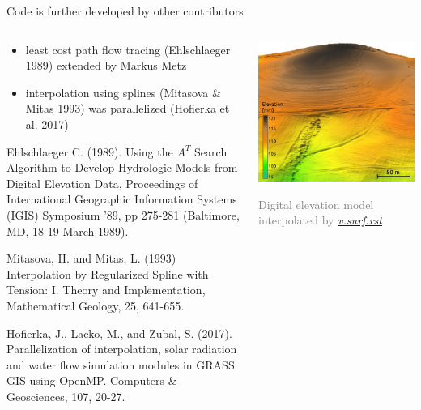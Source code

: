 \documentclass[xcolor={dvipsnames,usenames},beamer,aspectratio=169]{beamer}
\newcommand{\gmodule}[1]{\href{http://grass.osgeo.org/grass74/manuals/#1.html}{\emph{#1}}}
\begin{document}
\begin{frame}{Code is further developed by other contributors}

\begin{columns}
\begin{column}{0.5\textwidth}

\begin{itemize}
  \item least cost path flow tracing (Ehlschlaeger 1989) extended by Markus Metz
  \item interpolation using splines (Mitasova \& Mitas 1993) was parallelized (Hofierka et al. 2017)
\end{itemize}


\bigskip
\footnoterule
\tiny

Ehlschlaeger C. (1989). Using the $A^T$ Search Algorithm to Develop Hydrologic Models from Digital Elevation Data, Proceedings of International Geographic Information Systems (IGIS) Symposium '89, pp 275-281 (Baltimore, MD, 18-19 March 1989).

Mitasova, H. and Mitas, L. (1993) Interpolation by Regularized Spline with Tension: I. Theory and Implementation, Mathematical Geology, 25, 641-655.

Hofierka, J., Lacko, M., and Zubal, S. (2017). Parallelization of interpolation, solar radiation and water flow simulation modules in GRASS GIS using OpenMP. Computers \& Geosciences, 107, 20-27.

\end{column}
\begin{column}{0.5\textwidth}
\centering
\includegraphics[width=\textwidth]{elevation_lidar}

\textcolor{gray}{
\footnotesize
Digital elevation model interpolated by \gmodule{v.surf.rst}
}

\end{column}
\end{columns}

\end{frame}
\end{document}
